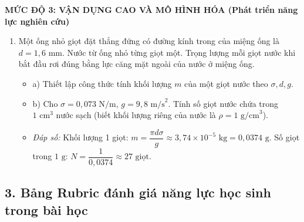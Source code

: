 \documentclass[12pt, a4paper]{article}
\begin{document}
\noindent \textbf{MỨC ĐỘ 3: VẬN DỤNG CAO VÀ MÔ HÌNH HÓA (Phát triển năng lực nghiên cứu)}
\begin{enumerate}
    \item Một ống nhỏ giọt đặt thẳng đứng có đường kính trong của miệng ống là $d = 1{,}6\text{ mm}$. Nước từ ống nhỏ từng giọt một. Trọng lượng mỗi giọt nước khi bắt đầu rơi đúng bằng lực căng mặt ngoài của nước ở miệng ống.
    \begin{itemize}
        \item a) Thiết lập công thức tính khối lượng $m$ của một giọt nước theo $\sigma, d, g$.
        \item b) Cho $\sigma = 0{,}073\text{ N/m}$, $g = 9{,}8\text{ m/s}^2$. Tính số giọt nước chứa trong $1\text{ cm}^3$ nước sạch (biết khối lượng riêng của nước là $\rho = 1\text{ g/cm}^3$).
        \item \textit{Đáp số:} Khối lượng 1 giọt: $m = \dfrac{\pi d \sigma}{g} \approx 3{,}74 \times 10^{-5}\text{ kg} = 0{,}0374\text{ g}$. Số giọt trong $1\text{ g}$: $N = \dfrac{1}{0{,}0374} \approx 27\text{ giọt}$.
    \end{itemize}
\end{enumerate}

\subsection*{3. Bảng Rubric đánh giá năng lực học sinh trong bài học}
\end{document}
